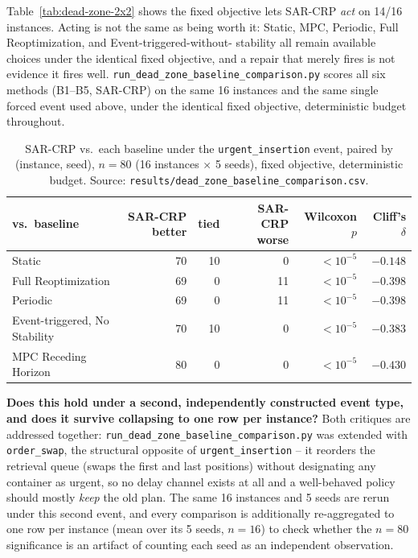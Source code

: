 \documentclass[11pt]{article}
\begin{document}
Table~\ref{tab:dead-zone-2x2} shows the fixed objective lets SAR-CRP
\emph{act} on 14/16 instances. Acting is not the same as being worth it:
Static, MPC, Periodic, Full Reoptimization, and Event-triggered-without-
stability all remain available choices under the identical fixed
objective, and a repair that merely fires is not evidence it fires well.
\texttt{run\_dead\_zone\_baseline\_comparison.py} scores all six methods
(B1--B5, SAR-CRP) on the same 16 instances and the same single forced
event used above, under the identical fixed objective, deterministic
budget throughout.

\begin{table}[h]
\centering
\small
\begin{tabular}{lrrrrr}
\hline
vs.\ baseline & SAR-CRP better & tied & SAR-CRP worse & Wilcoxon $p$ & Cliff's $\delta$ \\
\hline
Static                         & 70 & 10 & 0  & $<10^{-5}$ & $-0.148$ \\
Full Reoptimization            & 69 & 0  & 11 & $<10^{-5}$ & $-0.398$ \\
Periodic                       & 69 & 0  & 11 & $<10^{-5}$ & $-0.398$ \\
Event-triggered, No Stability  & 70 & 10 & 0  & $<10^{-5}$ & $-0.383$ \\
MPC Receding Horizon           & 80 & 0  & 0  & $<10^{-5}$ & $-0.430$ \\
\hline
\end{tabular}
\caption{SAR-CRP vs.\ each baseline under the \texttt{urgent\_insertion}
event, paired by (instance, seed), $n=80$ (16 instances $\times$ 5 seeds),
fixed objective, deterministic budget. Source:
\texttt{results/dead\_zone\_baseline\_comparison.csv}.}
\label{tab:dead-zone-baselines}
\end{table}

\textbf{Does this hold under a second, independently constructed event
type, and does it survive collapsing to one row per instance?} Both
critiques are addressed together: \texttt{run\_dead\_zone\_baseline\_comparison.py}
was extended with \texttt{order\_swap}, the structural opposite of
\texttt{urgent\_insertion} -- it reorders the retrieval queue (swaps the
first and last positions) without designating any container as urgent, so
no delay channel exists at all and a well-behaved policy should mostly
\emph{keep} the old plan. The same 16 instances and 5 seeds are rerun
under this second event, and every comparison is additionally
re-aggregated to one row per instance (mean over its 5 seeds, $n=16$) to
check whether the $n=80$ significance is an artifact of counting each
seed as an independent observation.
\end{document}

